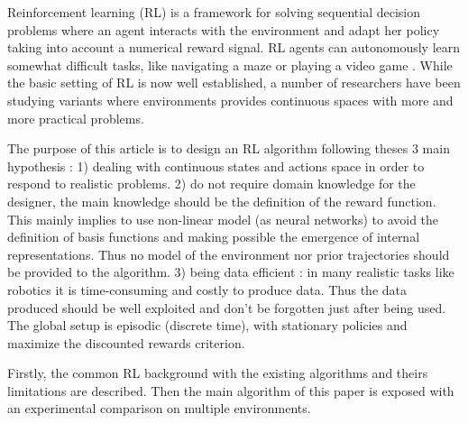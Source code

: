 Reinforcement learning (RL) \cite{Sutton1998} is a framework for solving sequential decision
problems where an agent interacts with the environment and adapt her policy
taking into account a numerical reward signal. RL agents can autonomously
learn somewhat difficult tasks, like navigating a maze or playing a video game \cite{Tesauro1994}.
While the basic setting of RL is now well established, a number of researchers have been
studying variants where environments provides continuous spaces with more and more practical problems.

The purpose of this article is to design an RL algorithm following theses 3 main hypothesis :
1) dealing with continuous states and actions space in order to respond to realistic problems.
2) do not require domain knowledge for the designer, the main knowledge should be the definition of the reward function.
This mainly implies to use non-linear model (as neural networks) to avoid the definition of basis functions and
making possible the emergence of internal representations. Thus no model of the environment nor prior trajectories should
be provided to the algorithm.
3) being data efficient : in many realistic tasks like robotics it is time-consuming and costly to produce data.
Thus the data produced should be well exploited and don't be forgotten just after being used.
The global setup is episodic (discrete time), with stationary policies and maximize the
discounted rewards criterion.


Firstly, the common RL background with the existing algorithms and theirs limitations are described.
Then the main algorithm of this paper is exposed with an experimental comparison on multiple environments.
